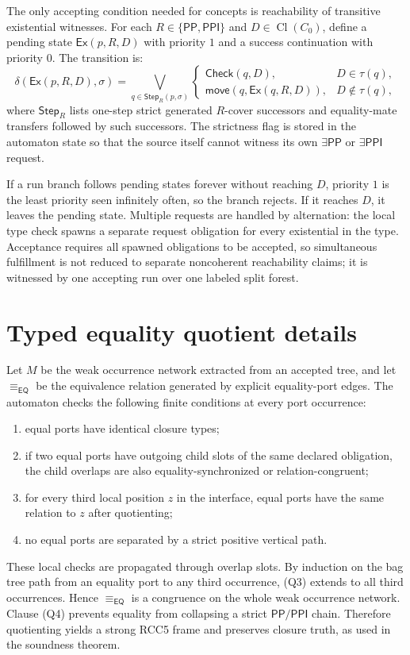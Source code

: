 \documentclass[11pt]{article}
\newcommand{\EQ}{\mathsf{EQ}}
\newcommand{\PP}{\mathsf{PP}}
\newcommand{\PPI}{\mathsf{PPI}}
\newcommand{\Cl}{\operatorname{Cl}}
\begin{document}
The only accepting condition needed for concepts is reachability of transitive existential witnesses.  For each $R\in\{\PP,\PPI\}$ and $D\in\Cl(C_0)$, define a pending state $\mathsf{Ex}(p,R,D)$ with priority $1$ and a success continuation with priority $0$.  The transition is:
\[
\delta(\mathsf{Ex}(p,R,D),\sigma)
=
\bigvee_{q\in \mathsf{Step}_R(p,\sigma)}
\begin{cases}
\mathsf{Check}(q,D),& D\in\tau(q),\\
\mathsf{move}(q,\mathsf{Ex}(q,R,D)),& D\notin\tau(q),
\end{cases}
\]
where $\mathsf{Step}_R$ lists one-step strict generated $R$-cover successors and equality-mate transfers followed by such successors.  The strictness flag is stored in the automaton state so that the source itself cannot witness its own $\exists\PP$ or $\exists\PPI$ request.

If a run branch follows pending states forever without reaching $D$, priority $1$ is the least priority seen infinitely often, so the branch rejects.  If it reaches $D$, it leaves the pending state.  Multiple requests are handled by alternation: the local type check spawns a separate request obligation for every existential in the type.  Acceptance requires all spawned obligations to be accepted, so simultaneous fulfillment is not reduced to separate noncoherent reachability claims; it is witnessed by one accepting run over one labeled split forest.

\section{Typed equality quotient details}

Let $M$ be the weak occurrence network extracted from an accepted tree, and let $\equiv_{\EQ}$ be the equivalence relation generated by explicit equality-port edges.  The automaton checks the following finite conditions at every port occurrence:
\begin{enumerate}[label=(Q\arabic*)]
\item equal ports have identical closure types;
\item if two equal ports have outgoing child slots of the same declared obligation, the child overlaps are also equality-synchronized or relation-congruent;
\item for every third local position $z$ in the interface, equal ports have the same relation to $z$ after quotienting;
\item no equal ports are separated by a strict positive vertical path.
\end{enumerate}
These local checks are propagated through overlap slots.  By induction on the bag tree path from an equality port to any third occurrence, (Q3) extends to all third occurrences.  Hence $\equiv_{\EQ}$ is a congruence on the whole weak occurrence network.  Clause (Q4) prevents equality from collapsing a strict $\PP/\PPI$ chain.  Therefore quotienting yields a strong RCC5 frame and preserves closure truth, as used in the soundness theorem.
\end{document}
